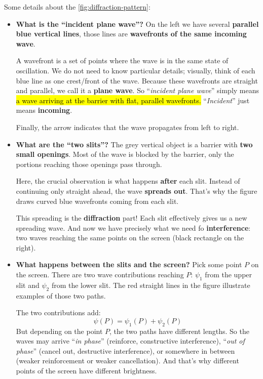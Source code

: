 \highspace
\begin{deepeningbox}
    Some details about the \autoref{fig:diffraction-pattern}:
    \begin{itemize}
        \item[\textcolor{Green3}{\faIcon{question-circle}}] \textcolor{Green3}{\textbf{What is the ``incident plane wave''?}} On the left we have several \textbf{parallel blue vertical lines}, those lines are \textbf{wavefronts of the same incoming wave}.

            A wavefront is a set of points where the wave is in the same state of oscillation. We do not need to know particular details; visually, think of each blue line as one crest/front of the wave. Because these wavefronts are straight and parallel, we call it a \textbf{plane wave}. So ``\emph{incident plane wave}'' simply means \hl{a wave arriving at the barrier with flat, parallel wavefronts.} ``\emph{Incident}'' just means \textbf{incoming}.

            Finally, the arrow indicates that the wave propagates from left to right.

        \item[\textcolor{Green3}{\faIcon{question-circle}}] \textcolor{Green3}{\textbf{What are the ``two slits''?}} The grey vertical object is a barrier with \textbf{two small openings}. Most of the wave is blocked by the barrier, only the portions reaching those openings pass through.

            Here, the crucial observation is what happens \textbf{after} each slit. Instead of continuing only straight ahead, the wave \textbf{spreads out}. That's why the figure draws curved blue wavefronts coming from each slit.

            This spreading is the \textbf{diffraction} part! Each slit effectively gives us a new spreading wave. And now we have precisely what we need fo \textbf{interference}: two waves reaching the same points on the screen (black rectangle on the right).

        \item[\textcolor{Green3}{\faIcon{question-circle}}] \textcolor{Green3}{\textbf{What happens between the slits and the screen?}} Pick some point $P$ on the screen. There are two wave contributions reaching $P$: $\psi_1$ from the upper slit and $\psi_2$ from the lower slit. The red straight lines in the figure illustrate examples of those two paths.

            The two contributions add:
            \begin{equation*}
                \psi(P) = \psi_1(P) + \psi_2(P)
            \end{equation*}
            But depending on the point $P$, the two paths have different lengths. So the waves may arrive ``\emph{in phase}'' (reinforce, constructive interference), ``\emph{out of phase}'' (cancel out, destructive interference), or somewhere in between (weaker reinforcement or weaker cancellation). And that's why different points of the screen have different brightness.


\end{itemize}
\end{deepeningbox}
